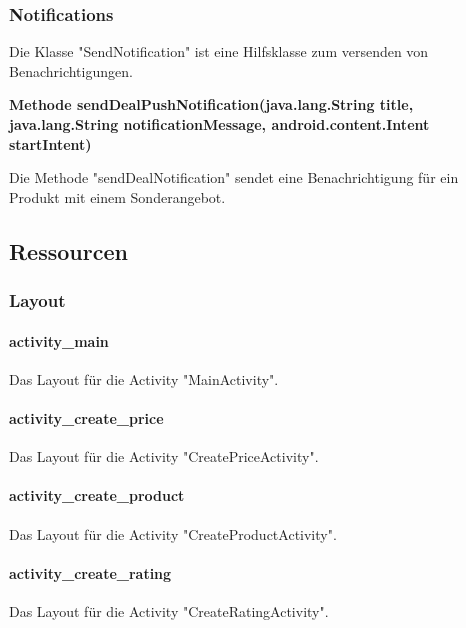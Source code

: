 \documentclass{scrartcl}
\begin{document}
\subsubsection{Notifications}
Die Klasse "SendNotification" ist eine Hilfsklasse zum versenden von Benachrichtigungen. \newline 

\noindent\textbf{Methode sendDealPushNotification(java.lang.String title, \newline         java.lang.String notificationMessage,                                    android.content.Intent startIntent)}

\noindent Die Methode "sendDealNotification" sendet eine Benachrichtigung für ein Produkt mit einem Sonderangebot. \newline 

\subsection{Ressourcen}

\subsubsection{Layout}

\paragraph{activity\_main} \mbox{} 

\noindent Das Layout für die Activity "MainActivity". 

\paragraph{activity\_create\_price} \mbox{} 

\noindent Das Layout für die Activity "CreatePriceActivity".

\paragraph{activity\_create\_product} \mbox{} 

\noindent Das Layout für die Activity "CreateProductActivity".

\paragraph{activity\_create\_rating} \mbox{} 

\noindent Das Layout für die Activity "CreateRatingActivity".
\end{document}
